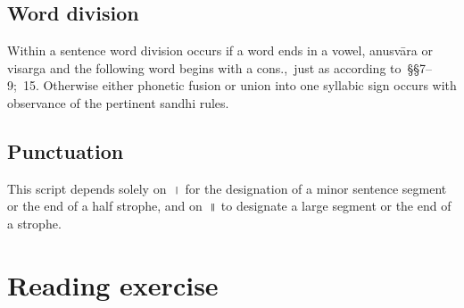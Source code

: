 \documentclass{article}
\newcommand{\siddhanta}[1]{\mbox{\Siddhanta#1}}
\newcommand{\lingual}[1]{\textit{#1}}
\begin{document}
\subsection*{Word division}
Within a sentence word division occurs if a word ends in a vowel, anusvāra or visarga and the following word begins with a cons.,\ just as according to~\S\S7--9;~15. Otherwise either phonetic fusion or union into one syllabic sign occurs with observance of the pertinent sandhi rules.

\subsection*{Punctuation}
This script depends solely on~\siddhanta{।} for the designation of a minor sentence segment or the end of a half strophe, and on~\siddhanta{॥} to designate a large segment or the end of a strophe.

\section*{Reading exercise}
\let\latin\lingual
\def\hyphlat{&\latin{-}&}
\def\hyphsans{&\siddhanta{-}&}
\newcommand{\row}[3]{\begin{tabular}{#1}#2\\#3\\\end{tabular}\\[.7em]}
\end{document}
